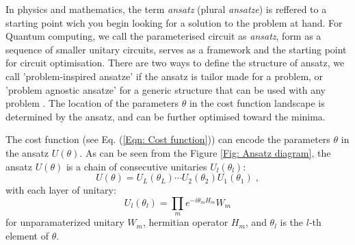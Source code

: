 In physics and mathematics, the term \emph{ansatz} (plural \emph{ansatze}) is reffered to a starting point wich you begin looking for a solution to the problem at hand.
For Quantum computing, we call the parameterised circuit as \emph{ansatz}, form as a sequence of smaller unitary circuits, serves as a framework and the starting point for circuit optimisation.
There are two ways to define the structure of ansatz, we call 'problem-inspired ansatze' if the ansatz is tailor made for a problem, or 'problem agnostic ansatze' for a generic structure that can be used with any problem \cite{cerezo2021variational}.
The location of the parameters $\theta$ in the cost function landscape is determined by the ansatz, and can be further optimised toward the minima.



The cost function (see Eq. (\ref{Eqn: Cost function})) can encode the parameters $\theta$ in the ansatz $U(\theta)$.
As can be seen from the Figure \ref{Fig: Ansatz diagram}, the ansatz $U(\theta)$ is a chain of consecutive unitaries $U_l(\theta_l)$:
\begin{equation}
    U(\theta) = U_L(\theta_L) \cdots U_2(\theta_2) U_1(\theta_1)\;,
\end{equation}
with each layer of unitary:
\begin{equation}
    U_l(\theta_l) = \prod_m e^{-i\theta_m H_m} W_m
\end{equation}
for unparamaterized unitary $W_m$, hermitian operator $H_m$, and $\theta_l$ is the $l$-th element of $\theta$.